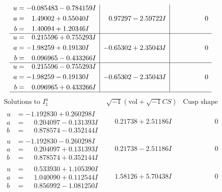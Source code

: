 \documentclass[1p]{elsarticle_modified}
\theoremstyle{definition}
\newcommand{\I}{\sqrt{-1}}
\begin{document}
$$\begin{array}{c|c|c}
\begin{aligned}
u &= -0.085483 - 0.784159 I \\
a &= \phantom{-}1.49002 + 0.55040 I \\
b &= \phantom{-}1.40094 + 1.20346 I\end{aligned}
 & \phantom{-}0.97297 - 2.59722 I & \phantom{-0.000000 } 0 \\ \hline\begin{aligned}
u &= \phantom{-}0.215596 + 0.755293 I \\
a &= -1.98259 + 0.19130 I \\
b &= \phantom{-}0.096965 - 0.433266 I\end{aligned}
 & -0.65302 + 2.35043 I & \phantom{-0.000000 } 0 \\ \hline\begin{aligned}
u &= \phantom{-}0.215596 - 0.755293 I \\
a &= -1.98259 - 0.19130 I \\
b &= \phantom{-}0.096965 + 0.433266 I\end{aligned}
 & -0.65302 - 2.35043 I & \phantom{-0.000000 } 0\\
 \hline 
 \end{array}$$\newpage$$\begin{array}{c|c|c}  
\text{Solutions to }I^u_{1}& \I (\text{vol} + \sqrt{-1}CS) & \text{Cusp shape}\\
 \hline 
\begin{aligned}
u &= -1.192830 + 0.260298 I \\
a &= \phantom{-}0.204097 - 0.131393 I \\
b &= \phantom{-}0.878574 - 0.352144 I\end{aligned}
 & \phantom{-}0.21738 + 2.51186 I & \phantom{-0.000000 } 0 \\ \hline\begin{aligned}
u &= -1.192830 - 0.260298 I \\
a &= \phantom{-}0.204097 + 0.131393 I \\
b &= \phantom{-}0.878574 + 0.352144 I\end{aligned}
 & \phantom{-}0.21738 - 2.51186 I & \phantom{-0.000000 } 0 \\ \hline\begin{aligned}
u &= \phantom{-}0.533930 + 1.105390 I \\
a &= \phantom{-}1.040090 + 0.112544 I \\
b &= \phantom{-}0.856992 - 1.081250 I\end{aligned}
 & \phantom{-}1.58126 + 5.70438 I & \phantom{-0.000000 } 0 \\ \hline\begin{aligned}

\end{aligned}
\end{array}$$
\end{document}
